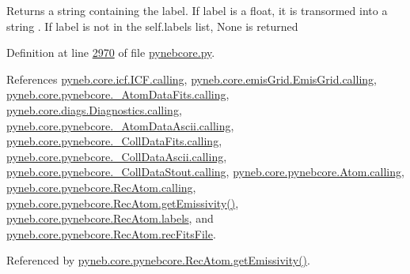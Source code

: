 \begin{DoxyVerb}Returns a string containing the label. 
If label is a float, it is transormed into a string .
If label is not in the self.labels list, None is returned\end{DoxyVerb}
 

Definition at line \hyperlink{pynebcore_8py_source_l02970}{2970} of file \hyperlink{pynebcore_8py_source}{pynebcore.\-py}.



References \hyperlink{icf_8py_source_l00016}{pyneb.\-core.\-icf.\-I\-C\-F.\-calling}, \hyperlink{emis_grid_8py_source_l00044}{pyneb.\-core.\-emis\-Grid.\-Emis\-Grid.\-calling}, \hyperlink{pynebcore_8py_source_l00097}{pyneb.\-core.\-pynebcore.\-\_\-\-Atom\-Data\-Fits.\-calling}, \hyperlink{diags_8py_source_l00169}{pyneb.\-core.\-diags.\-Diagnostics.\-calling}, \hyperlink{pynebcore_8py_source_l00318}{pyneb.\-core.\-pynebcore.\-\_\-\-Atom\-Data\-Ascii.\-calling}, \hyperlink{pynebcore_8py_source_l00585}{pyneb.\-core.\-pynebcore.\-\_\-\-Coll\-Data\-Fits.\-calling}, \hyperlink{pynebcore_8py_source_l00936}{pyneb.\-core.\-pynebcore.\-\_\-\-Coll\-Data\-Ascii.\-calling}, \hyperlink{pynebcore_8py_source_l01156}{pyneb.\-core.\-pynebcore.\-\_\-\-Coll\-Data\-Stout.\-calling}, \hyperlink{pynebcore_8py_source_l01229}{pyneb.\-core.\-pynebcore.\-Atom.\-calling}, \hyperlink{pynebcore_8py_source_l02643}{pyneb.\-core.\-pynebcore.\-Rec\-Atom.\-calling}, \hyperlink{pynebcore_8py_source_l02990}{pyneb.\-core.\-pynebcore.\-Rec\-Atom.\-get\-Emissivity()}, \hyperlink{pynebcore_8py_source_l02746}{pyneb.\-core.\-pynebcore.\-Rec\-Atom.\-labels}, and \hyperlink{pynebcore_8py_source_l02646}{pyneb.\-core.\-pynebcore.\-Rec\-Atom.\-rec\-Fits\-File}.



Referenced by \hyperlink{pynebcore_8py_source_l02990}{pyneb.\-core.\-pynebcore.\-Rec\-Atom.\-get\-Emissivity()}.



